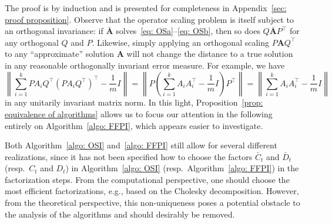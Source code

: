 \documentclass[a4paper]{article}
\newcommand{\bA}{\mathbf{A}}
\theoremstyle{definition}
\numberwithin{equation}{section}
\begin{document}
The proof is by induction and is presented for completeness in Appendix~\ref{sec: proof proposition}. Observe that the operator scaling problem is itself subject to an orthogonal invariance: if $\bar{\bA}$ solves~\eqref{eq: OSa}--\eqref{eq: OSb}, then so does $Q \bar{\bA} P^\top$ for any orthogonal $Q$ and $P$. Likewise, simply applying an orthogonal scaling $P \bA Q^\top$ to any ``approximate'' solution $\bA$ will not change the distance to a true solution in any reasonable orthogonally invariant error measure. For example, we have
\[
 \left\| \sum_{i=1}^k P A_i Q^\top (PA_iQ^\top)^\top - \frac{1}{m} I \right\| = \left\| P \left( \sum_{i=1}^k A_i A_i^\top - \frac{1}{m} I \right) P^\top \right\| = \left\| \sum_{i=1}^k A_i A_i^\top - \frac{1}{m} I \right\|
\]
in any unitarily invariant matrix norm. In this light, Proposition~\ref{prop: equivalence of algorithms} allows us to focus our attention in the following entirely on Algorithm~\ref{algo: FFPI}, which appears easier to investigate.

Both Algorithm~\ref{algo: OSI} and~\ref{algo: FFPI} still allow for several different realizations, since it has not been specified how to choose the factors $\bar C_t$ and $\bar D_t$ (resp.~$C_t$ and $D_t$) in Algorithm~\ref{algo: OSI} (resp.~Algorithm~\ref{algo: FFPI})  in the factorization steps. From the computational perspective, one should choose the most efficient factorizations, e.g., based on the Cholesky decomposition. However, from the theoretical perspective, this non-uniqueness poses a potential obstacle to the analysis of the algorithms and should desirably be removed.
\end{document}

